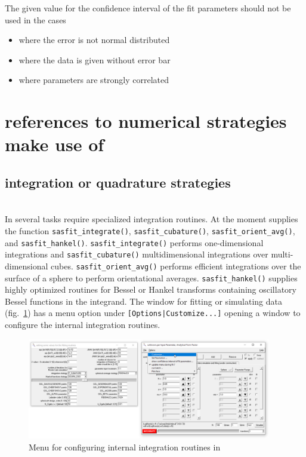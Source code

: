 The given value for the confidence interval of the fit parameters should not be used in the cases
\begin{itemize}
\item where the error is not normal distributed
\item where the data is given without error bar
\item where parameters are strongly correlated
\end{itemize}

\clearpage
\section{references to numerical strategies \SASfit make use of}

\subsection{integration or quadrature strategies} ~\\

In \SASfit several tasks require specialized integration routines. At the moment \SASfit supplies the function \texttt{sasfit\_integrate()}, \texttt{sasfit\_cubature()},
\texttt{sasfit\_orient\_avg()}, and \texttt{sasfit\_hankel()}.
\texttt{sasfit\_integrate()} performs one-dimensional integrations and \texttt{sasfit\_cubature()} multidimensional integrations over multi-dimensional cubes. \texttt{sasfit\_orient\_avg()} performs efficient integrations over the surface of a sphere to perform orientational averages. \texttt{sasfit\_hankel()} supplies highly optimized routines for Bessel or Hankel transforms containing oscillatory Bessel functions in the integrand. The window for fitting or simulating data (fig.\ \ref{fig:CustomizeIntGUI}) has a menu option under \texttt{[Options|Customize...]} opening a window to configure the internal integration routines.
\begin{figure}[htb]
\begin{center}
\includegraphics[width=0.95\textwidth]{../images/GUI/CustomizeWindow.pdf}
\end{center}
\caption{Menu for configuring internal integration routines in \SASfit}
\label{fig:CustomizeIntGUI}
\end{figure}

